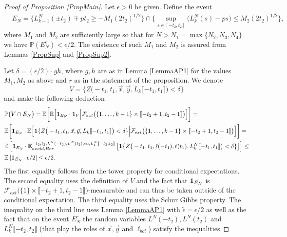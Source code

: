 \begin{proof}[Proof of Proposition \ref{PropMain}] Let $\epsilon > 0$ be given. Define the event
	\begin{equation*}
	\begin{split}
	&E_N = \Big\{    L_{k-1}^N(  \pm t_2) \mp pt_2 \geq  - M_1 (2t_2)^{1/2}\Big\} \cap \Big\{ \sup_{s \in [ -t_2, t_2]} \big( {L}^N_{k}(s) - p s \big)\leq M_2  (2t_2)^{1/2} \Big\},
	\end{split}
	\end{equation*}
	where $M_1$ and $M_2$ are sufficiently large so that for $N>N_1=\max\{N_2,N_3,N_4\}$ we have $\mathbb{P}(E_N^c) <  \epsilon / 2$. The existence of such $M_1$ and $M_2$ is assured from Lemmas \ref{PropSup} and \ref{PropSup2}. 
	
	Let $\delta = (\epsilon/2) \cdot g h$, where $g,h$ are as in Lemma \ref{LemmaAP1} for the values $M_1, M_2$ as above and $r$ as in the statement of the proposition.
	We denote
	$$V = \Big\{Z\big( -t_1,t_1, \vec{x}, \vec{y} , L_{k}\llbracket -t_1, t_1\rrbracket\big)< \delta\Big\}$$
	and make the following deduction
	\begin{equation}\label{boundoneEN}
	\begin{split}
	&\mathbb{P}\big( V \cap E_N \big) =\mathbb{E} \bigg[    \mathbb{E}\Big[{\bf 1}_{E_N} \cdot {\bf 1}_{V} \Big{|} \mathcal{F}_{ext} \big( \{1, \dots, k-1\} \times \llbracket -t_2 + 1,t_2 - 1\rrbracket \big)\Big] \bigg] = \\
	&\mathbb{E} \bigg[ {\bf 1}_{E_N} \cdot   \mathbb{E}\Big[ {\bf 1} \{ Z\big( -t_1,t_1, \vec{x}, \vec{y} , L_{k}\llbracket -t_1, t_1\rrbracket \big) < \delta\}   \Big{|} \mathcal{F}_{ext} \big( \{1, \dots, k-1\} \times \llbracket -t_2 + 1,t_2 - 1\rrbracket \big)\Big] \bigg]  = \\
	&\mathbb{E} \left[ {\bf 1}_{E_N} \cdot  \mathbb{E}^{-t_2, t_2, L^N(-t_2), L^N(t_2), \infty, L^N_k\llbracket -t_2, t_2\rrbracket }_{avoid, Ber}\left[ {\bf 1} \{ Z\big( -t_1, t_1, \ell(-t_1),\ell(t_1),{L}^N_k\llbracket -t_1, t_1\rrbracket \big) < \delta\} \right] \right] \leq \\
	&  \mathbb{E} \left[ {\bf 1}_{E_N} \cdot  \epsilon/2 \right] \leq \epsilon/2.
	\end{split}
	\end{equation}
	The first equality follows from the tower property for conditional expectations. The second equality uses the definition of $V$ and the fact that ${\bf 1}_{E_N} $ is $\mathcal{F}_{ext} \big( \{1\} \times \llbracket -t_2 + 1,t_2 - 1\rrbracket\big)$-measurable and can thus be taken outside of the conditional expectation. The third equality uses the Schur Gibbs property. The inequality on the third line uses Lemma \ref{LemmaAP1} with $\tilde{\epsilon} = \epsilon/2$ as well as the fact that on the event $E_N^c$ the random variables $L^N(-t_2), L^N(t_2)$ and $L^N_k \llbracket -t_2, t_2 \rrbracket$ (that play the roles of $\vec{x}, \vec{y}$ and $\ell_{bot}$) satisfy the inequalities 

\end{proof}

